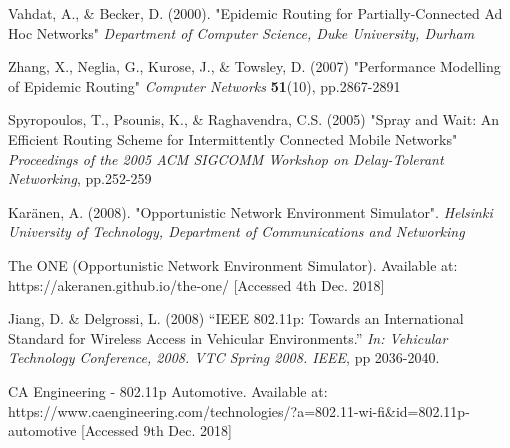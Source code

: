 \documentclass{article}
\begin{document}
\begin{thebibliography}{20}
Vahdat, A., \& Becker, D. (2000).
"Epidemic Routing for Partially-Connected Ad Hoc Networks"
\textit{Department of Computer Science, Duke University, Durham}

Zhang, X., Neglia, G., Kurose, J., \& Towsley, D. (2007)
"Performance Modelling of Epidemic Routing"
\textit{Computer Networks} \textbf{51}(10), pp.2867-2891

Spyropoulos, T., Psounis, K., \& Raghavendra, C.S. (2005)
"Spray and Wait: An Efficient Routing Scheme for
Intermittently Connected Mobile Networks"
\textit{Proceedings of the 2005 ACM SIGCOMM Workshop on Delay-Tolerant Networking}, pp.252-259

Karänen, A. (2008).
"Opportunistic Network Environment Simulator".
\textit{Helsinki University of Technology, Department of Communications and Networking}

The ONE (Opportunistic Network Environment Simulator). Available at: https://akeranen.github.io/the-one/ [Accessed 4th Dec. 2018]

Jiang, D. \& Delgrossi, L. (2008)
``IEEE 802.11p: Towards an International Standard for Wireless Access in Vehicular Environments.'' 
\textit{In: Vehicular Technology Conference, 2008. VTC Spring 2008. IEEE}, pp 2036-2040.

CA Engineering - 802.11p Automotive. Available at: https://www.caengineering.com/technologies/?a=802.11-wi-fi&id=802.11p-automotive [Accessed 9th Dec. 2018]

\end{thebibliography}
 
\end{document}
